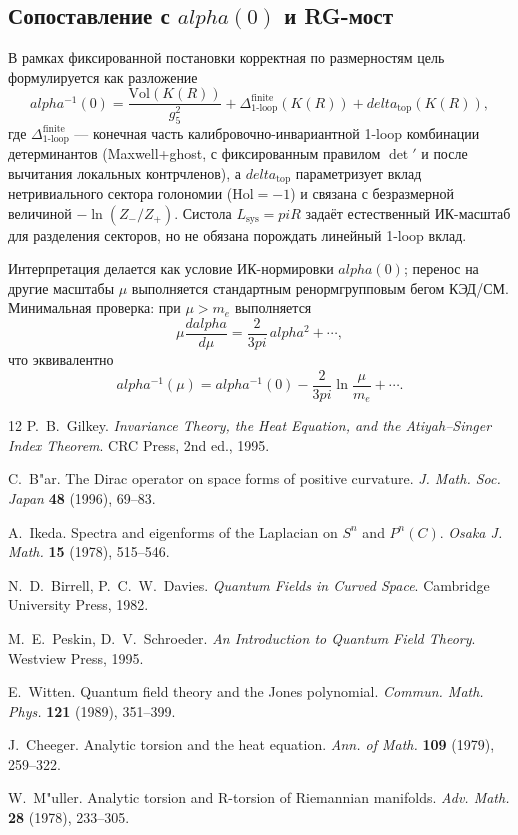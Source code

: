 \documentclass[12pt]{article}
\def\mathbb#1{#1}%
\def\alpha{alpha}%
\def\pi{pi}%
\def\delta{delta}%
\begin{document}
\subsection{Сопоставление с $\alpha(0)$ и RG-мост}
В рамках фиксированной постановки корректная по размерностям цель формулируется как разложение
\begin{equation}\label{eq:alpha_candidate_appendix}
  \alpha^{-1}(0)
  =
  \frac{\mathrm{Vol}(K(R))}{g_5^2}
  +\Delta^{\mathrm{finite}}_{\mathrm{1\text{-}loop}}(K(R))
  +\delta_{\mathrm{top}}(K(R)),
\end{equation}
где $\Delta^{\mathrm{finite}}_{\mathrm{1\text{-}loop}}$ --- конечная часть калибровочно-инвариантной 1-loop комбинации детерминантов (Maxwell+ghost, с фиксированным правилом $\det'$ и после вычитания локальных контрчленов), а $\delta_{\mathrm{top}}$ параметризует вклад нетривиального сектора голономии ($\mathrm{Hol}=-1$) и связана с безразмерной величиной $-\ln(Z_{-}/Z_{+})$.
Систола $L_{\mathrm{sys}}=\pi R$ задаёт естественный ИК-масштаб для разделения секторов, но не обязана порождать линейный 1-loop вклад.

Интерпретация делается как условие ИК-нормировки $\alpha(0)$; перенос на другие масштабы $\mu$ выполняется стандартным ренормгрупповым бегом КЭД/СМ.
Минимальная проверка: при $\mu>m_e$ выполняется
\begin{equation}
  \mu\frac{d\alpha}{d\mu}=\frac{2}{3\pi}\,\alpha^2+\cdots, 
\end{equation}
что эквивалентно
\begin{equation}
  \alpha^{-1}(\mu)=\alpha^{-1}(0)-\frac{2}{3\pi}\ln\frac{\mu}{m_e}+\cdots.
\end{equation}

\begin{thebibliography}{12}
P.~B.~Gilkey.
\textit{Invariance Theory, the Heat Equation, and the Atiyah--Singer Index Theorem}.
CRC Press, 2nd ed., 1995.

C.~B{"a}r.
The Dirac operator on space forms of positive curvature.
\textit{J. Math. Soc. Japan} \textbf{48} (1996), 69--83.

A.~Ikeda.
Spectra and eigenforms of the Laplacian on $S^n$ and $P^n(\mathbb{C})$.
\textit{Osaka J. Math.} \textbf{15} (1978), 515--546.

N.~D.~Birrell, P.~C.~W.~Davies.
\textit{Quantum Fields in Curved Space}.
Cambridge University Press, 1982.

M.~E.~Peskin, D.~V.~Schroeder.
\textit{An Introduction to Quantum Field Theory}.
Westview Press, 1995.

E.~Witten.
Quantum field theory and the Jones polynomial.
\textit{Commun. Math. Phys.} \textbf{121} (1989), 351--399.

J.~Cheeger.
Analytic torsion and the heat equation.
\textit{Ann. of Math.} \textbf{109} (1979), 259--322.

W.~M{"u}ller.
Analytic torsion and R-torsion of Riemannian manifolds.
\textit{Adv. Math.} \textbf{28} (1978), 233--305.
\end{thebibliography}
\end{document}
